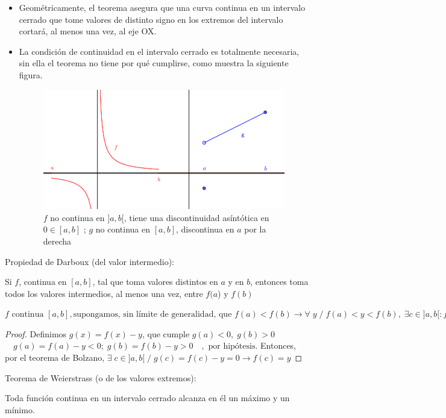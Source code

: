	\begin{itemize}
		\item Geométricamente, el teorema asegura que una curva continua en un intervalo cerrado que tome valores de distinto signo en los extremos del intervalo cortará, al menos una vez, al eje OX.
		\item La condición de continuidad en el intervalo cerrado es totalmente necesaria, sin ella el teorema no tiene por qué cumplirse, como muestra la siguiente figura.
		
		\begin{figure}[H]
 		\centering
			\includegraphics[width=.6\textwidth]{imagenes/imagenes03/T03IM14.png}
			\caption{$f$ no continua en $]a,b[$, tiene una discontinuidad asíntótica en $0\in [a,b]$ ; $g$ no continua en $[a,b]$, discontinua en $a$ por la derecha}
		\end{figure}
		
	\end{itemize}


	\begin{teor} Propiedad de Darboux (del valor intermedio):
	
	 Si $f$, continua en $[a,b]$, tal que toma valores distintos en $a$ y en $b$, entonces toma todos los valores intermedios, al menos una vez, entre $f(a$) y $f(b)$ 
	 
	 $f \mbox{ continua } [a,b], \mbox{supongamos, sin límite de generalidad, que } f(a)<f(b) \rightarrow \forall \; y \; / \; f(a)<y<f(b), \; \exists c \in ]a,b[ : f(c)=y$
	\end{teor}

	\begin{proof}
		
 	Definimos $g(x) = f(x) - y$, que cumple $g(a) < 0, \; g(b) > 0$ $\quad g(a)=f(a)-y <0;\; g(b)=f(b)-y>0 \quad , \mbox{ por hipótesis} $. Entonces, por el teorema de Bolzano, $\exists \; c \in  ]a, b[ \; / \;  g(c) = f (c) - y = 0 \to   f (c) = y$

 	\end{proof}
 


	\begin{teor} Teorema de Weierstrass (o de los valores extremos): 
		
	
	Toda función continua en un intervalo cerrado alcanza en él un máximo y un mínimo. 
	
	\end{teor}
	
